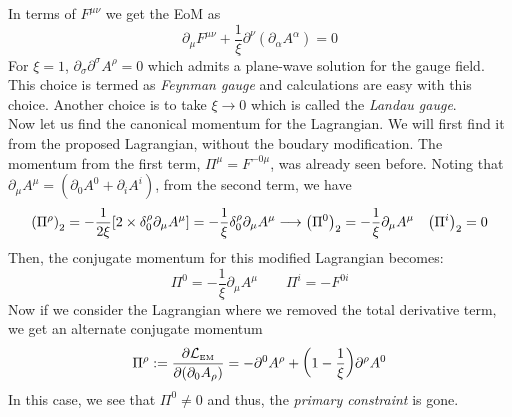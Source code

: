 In terms of $F^{\mu\nu}$ we get the EoM as $$\partial_\mu F^{\mu\nu}+\frac{1}{\xi}\partial^\nu(\partial_\alpha A^\alpha)=0$$
For $\xi=1$, $\partial_\sigma\partial^\sigma A^\rho = 0$ which admits a plane-wave solution for the gauge field. This choice is termed as \textit{Feynman gauge} and calculations are easy with this choice. Another choice is to take $\xi \to 0$ which is called the \textit{Landau gauge}.\\[0.2cm]
Now let us find the canonical momentum for the Lagrangian. We will first find it from the proposed Lagrangian, without the boudary modification. The momentum from the first term, $\Pi^\mu = F^{-0\mu}$, was already seen before. Noting that $\partial_\mu A^\mu = (\partial_0 A^0 + \partial_i A^i)$, from the second term, we have
\begin{align*}
   \qty(\Pi^\rho)_{2} =  -\frac{1}{2\xi}\qty[2 \times \delta_{0}^\rho \partial_\mu A^\mu] = -\frac{1}{\xi}\delta_{0}^\rho \partial_\mu A^\mu\longrightarrow \qty(\Pi^0)_2 = -\frac{1}{\xi}\partial_\mu A^\mu \quad \qty(\Pi^i)_2  =0
\end{align*}
Then, the conjugate momentum for this modified Lagrangian becomes:
$$\Pi^0 = -\frac{1}{\xi} \partial_\mu A^\mu \qquad \Pi^i = -F^{0i} $$
Now if we consider the Lagrangian where we removed the total derivative term, we get an alternate conjugate momentum
$$\Pi^\rho :=\pdv{ \mathcal L_{\text{\tiny EM}}}{(\partial_0 A_\rho)} = -\partial^0 A^\rho + \qty(1-\frac{1}{\xi})\partial^\rho A^0$$
In this case, we see that $\Pi^0\neq 0$ and thus, the \textit{primary constraint} is gone.
